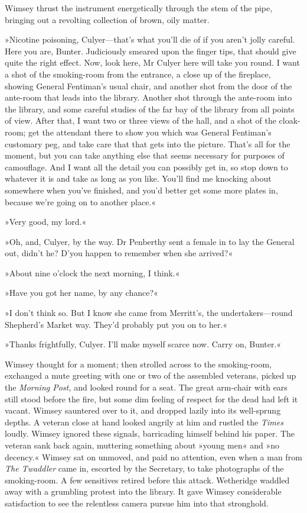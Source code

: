 Wimsey thrust the instrument energetically through the stem of the pipe, bringing out a revolting collection of brown, oily matter.

»Nicotine poisoning, Culyer\allowbreak---\allowbreak that's what you'll die of if you aren't jolly careful. Here you are, Bunter. Judiciously smeared upon the finger tips, that should give quite the right effect. Now, look here, Mr Culyer here will take you round. I want a shot of the smoking-room from the entrance, a close up of the fireplace, showing General Fentiman's usual chair, and another shot from the door of the ante-room that leads into the library. Another shot through the ante-room into the library, and some careful studies of the far bay of the library from all points of view. After that, I want two or three views of the hall, and a shot of the cloak-room; get the attendant there to show you which was General Fentiman's customary peg, and take care that that gets into the picture. That's all for the moment, but you can take anything else that seems necessary for purposes of camouflage. And I want all the detail you can possibly get in, so stop down to whatever it is and take as long as you like. You'll find me knocking about somewhere when you've finished, and you'd better get some more plates in, because we're going on to another place.«

»Very good, my lord.«

»Oh, and, Culyer, by the way. Dr Penberthy sent a female in to lay the General out, didn't he? D'you happen to remember when she arrived?«

»About nine o'clock the next morning, I think.«

»Have you got her name, by any chance?«

»I don't think so. But I know she came from Merritt's, the undertakers\allowbreak---\allowbreak round Shepherd's Market way. They'd probably put you on to her.«

»Thanks frightfully, Culyer. I'll make myself scarce now. Carry on, Bunter.«

Wimsey thought for a moment; then strolled across to the smoking-room, exchanged a mute greeting with one or two of the assembled veterans, picked up the \textit{Morning Post,} and looked round for a seat. The great arm-chair with ears still stood before the fire, but some dim feeling of respect for the dead had left it vacant. Wimsey sauntered over to it, and dropped lazily into its well-sprung depths. A veteran close at hand looked angrily at him and rustled the \textit{Times} loudly. Wimsey ignored these signals, barricading himself behind his paper. The veteran sank back again, muttering something about »young men« and »no decency.« Wimsey sat on unmoved, and paid no attention, even when a man from \textit{The Twaddler} came in, escorted by the Secretary, to take photographs of the smoking-room. A few sensitives retired before this attack. Wetheridge waddled away with a grumbling protest into the library. It gave Wimsey considerable satisfaction to see the relentless camera pursue him into that stronghold.

